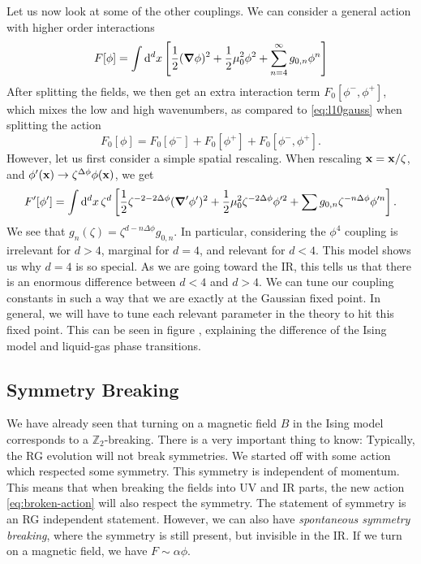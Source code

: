 Let us now look at some of the other couplings.
We can consider a general action with higher order interactions
\begin{equation}
  F[\phi] = \int \dd[d]{x} \left[ \frac{1}{2} (\grad \phi)^2 + \frac{1}{2} \mu_0^2 \phi^2 + \sum_{n=4}^{\infty} g_{0, n} \phi^n \right]
\end{equation}
After splitting the fields, we then get an extra interaction term $F_0[\phi^-, \phi^+]$, which mixes the low and high wavenumbers, as compared to \eqref{eq:l10gauss} when splitting the action
\begin{equation}
  \label{eq:broken-action}
  F_0[\phi] = F_0[\phi^-] + F_0[\phi^+] + F_0[\phi^-, \phi^+].
\end{equation}
However, let us first consider a simple spatial rescaling.
When rescaling $\vb{x} = \vb{x} / \zeta$, and $\phi'(\vb{x}) \to \zeta^{\Delta \phi} \phi(\vb{x})$, we get
\begin{equation}
  F'[\phi'] = \int \dd[d]{x} \zeta^d \left[ \frac{1}{2} \zeta^{-2 -2\Delta \phi} (\grad' \phi')^2 + \frac{1}{2} \mu_0^2 \zeta^{-2 \Delta \phi} \phi'^2 + \sum g_{0, n} \zeta^{-n \Delta \phi} \phi'^n \right].
\end{equation}
We see that $g_n (\zeta) = \zeta^{d - n \Delta \phi} g_{0, n}$. 
In particular, considering the $\phi^4$ coupling is irrelevant for $d > 4$, marginal for $d = 4$, and relevant for $d < 4$.
This model shows us why $d = 4$ is so special.
As we are going toward the IR, this tells us that there is an enormous difference between $d < 4$ and $d > 4$.
We can tune our coupling constants in such a way that we are exactly at the Gaussian fixed point.
In general, we will have to tune each relevant parameter in the theory to hit this fixed point.
This can be seen in figure %
, explaining the difference of the Ising model and liquid-gas phase transitions.

\subsection{Symmetry Breaking}%
\label{sub:symmetry_breaking}

We have already seen that turning on a magnetic field $B$ in the Ising model corresponds to a $\mathbb{Z}_2$-breaking.
There is a very important thing to know: Typically, the RG evolution will not break symmetries.
We started off with some action which respected some symmetry. This symmetry is independent of momentum. This means that when breaking the fields into UV and IR parts, the new action \eqref{eq:broken-action} will also respect the symmetry.
The statement of symmetry is an RG independent statement.
However, we can also have \emph{spontaneous symmetry breaking}, where the symmetry is still present, but invisible in the IR.
If we turn on a magnetic field, we have $F \sim \alpha \phi$.
